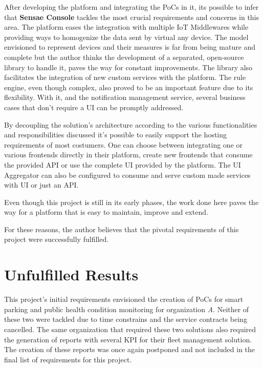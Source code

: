 After developing the platform and integrating the \gls{PoC}s in it, its possible to infer that \textbf{Sensae Console} tackles the most crucial requirements and concerns in this area. The platform eases the integration with multiple \gls{IoT} Middlewares while providing ways to homogenize the data sent by virtual any device. The model envisioned to represent devices and their measures is far from being mature and complete but the author thinks the development of a separated, open-source library to handle it, paves the way for constant improvements. The library also facilitates the integration of new custom services with the platform. The rule engine, even though complex, also proved to be an important feature due to its flexibility. With it, and the notification management service, several business cases that don't require a \gls{UI} can be promptly addressed.

By decoupling the solution's architecture according to the various functionalities and responsibilities discussed it's possible to easily support the hosting requirements of most costumers. One can choose between integrating one or various frontends directly in their platform, create new frontends that consume the provided \gls{API} or use the complete \gls{UI} provided by the platform. The \gls{UI} Aggregator can also be configured to consume and serve custom made services with \gls{UI} or just an \gls{API}.

Even though this project is still in its early phases, the work done here paves the way for a platform that is easy to maintain, improve and extend.

For these reasons, the author believes that the pivotal requirements of this project were successfully fulfilled.

\section{Unfulfilled Results}
\label{sec:conclusion:unfulfilled}

This project's initial requirements envisioned the creation of \gls{PoC}s for smart parking and public health condition monitoring for organization \textit{A}. Neither of these two were tackled due to time constrains and the service contracts being cancelled. The same organization that required these two solutions also required the generation of reports with several \gls{KPI} for their fleet management solution. The creation of these reports was once again postponed and not included in the final list of requirements for this project.

